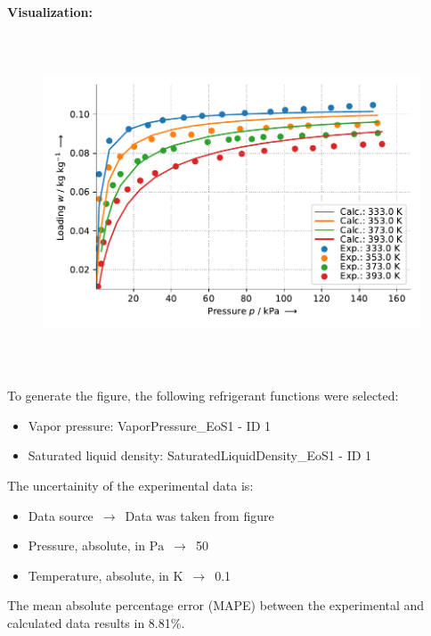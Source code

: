 \textbf{Visualization:}
%
\begin{figure}[!htp]
{\noindent\includegraphics[height=10cm, keepaspectratio]{figs/ads/ads_Isobutane_zeolite_pellet_13X_Toth_1.pdf}}
\end{figure}
%

To generate the figure, the following refrigerant functions were selected:
\begin{itemize}
\item Vapor pressure: VaporPressure\_EoS1 - ID 1
\item Saturated liquid density: SaturatedLiquidDensity\_EoS1 - ID 1
\end{itemize}

The uncertainity of the experimental data is:
\begin{itemize}
\item Data source $\,\to\,$ Data was taken from figure
\item Pressure, absolute, in $\si{\pascal}$ $\,\to\,$ 50
\item Temperature, absolute, in $\si{\kelvin}$ $\,\to\,$ 0.1
\end{itemize}

The mean absolute percentage error (MAPE) between the experimental and calculated data results in 8.81\%.
\FloatBarrier
\newpage

